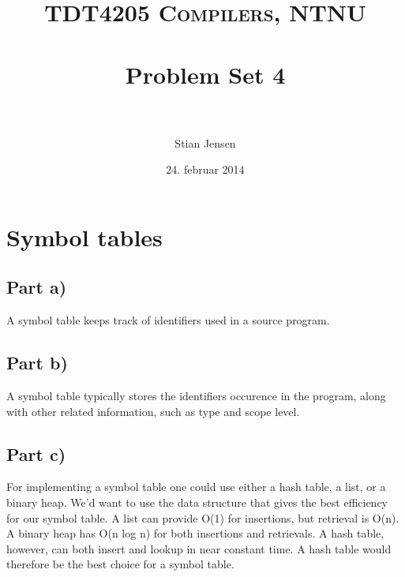 \documentclass[paper=a4, fontsize=11pt]{scrartcl} %
\title{ 
\normalfont \normalsize 
\textsc{TDT4205 Compilers, NTNU} \\ [25pt] %
\horrule{0.5pt} \\[0.4cm] %
\huge Problem Set 4 \\ %
\horrule{2pt} \\[0.5cm] %
}
\author{Stian Jensen} %
\date{\normalsize 24. februar 2014} %
\numberwithin{equation}{section} %
\numberwithin{figure}{section} %
\numberwithin{table}{section} %
\begin{document}
\maketitle %


\section{Symbol tables}

\subsection{Part a)}

A symbol table keeps track of identifiers used in a source program.



\subsection{Part b)}

A symbol table typically stores the identifiers occurence in the program, along with other related information, such as type and scope level.

\subsection{Part c)}

For implementing a symbol table one could use either a hash table, a list, or a binary heap.
We'd want to use the data structure that gives the best efficiency for our symbol table.
A list can provide O(1) for insertions, but retrieval is O(n).
A binary heap has O(n log n) for both insertions and retrievals.
A hash table, however, can both insert and lookup in near constant time.
A hash table would therefore be the best choice for a symbol table.

\end{document}

